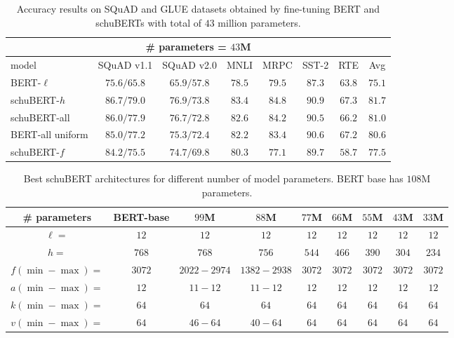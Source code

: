 \documentclass[11pt,a4paper]{article}
\begin{document}
\begin{table}[h]
\centering
\begin{tabular}{lcccccc|c}
\multicolumn{8}{c}{\# parameters = $43$M}\\
\hline
model & SQuAD v1.1 & SQuAD v2.0 & MNLI & MRPC & SST-2 & RTE & Avg\\
\hline
BERT-$\ell$ & $75.6/65.8$ &$65.9/57.8$& $78.5$ & $79.5$ & $87.3$ & $63.8$ & $75.1$\\
schuBERT-$h$ & $\pmb{86.7/79.0}$ &$\pmb{76.9/73.8}$& $\pmb{83.4}$ & $\pmb{84.8}$ & $\pmb{90.9}$ & $\pmb{67.3}$ & $\pmb{81.7}$\\
schuBERT-all & $86.0/77.9$ &$76.7/72.8$& $82.6$ & $84.2$ & $90.5$ & $66.2$ & $81.0$\\
BERT-all uniform & $85.0/77.2$ &$75.3/72.4$& $82.2$ & $83.4$ & $90.6$ & $67.2$ & $80.6$\\
schuBERT-$f$ & $84.2/75.5$ &$74.7/69.8$& $80.3$ & $77.1$ & $89.7$ & $58.7$ & $77.5$
\end{tabular}
\caption{\label{tab:results_43}Accuracy results on SQuAD and GLUE datasets obtained by fine-tuning BERT and schuBERTs with total of $43$ million parameters.
}
\end{table}

\begin{table}[h]
\centering
\begin{tabular}{c|cccccccc}
\hline
\# parameters & BERT-base & $99$M & $88$M & $77$M & $66$M & $55$M & $43$M & $33$M\\
\hline
$\ell =$ & $12$ & $12$ & $12$ & $12$ & $12$ & $12$ & $12$ & $12$\\
$h =$  & $768$ & $768$ & $756$ & $544$ & $466$ & $390$ & $304$ & $234$\\
$f(\min-\max) =$  & $3072$& $2022-2974$ & $1382-2938$ & $3072$ & $3072$ & $3072$ & $3072$ & $3072$\\
$a(\min-\max) =$  & $12$& $11-12$ & $11-12$ & $12$ & $12$ & $12$ & $12$ & $12$\\
$k(\min-\max) =$  & $64$& $64$ & $64$ & $64$ & $64$ & $64$ & $64$ & $64$\\
$v(\min-\max) =$  & $64$& $46-64$ & $40-64$ & $64$ & $64$ & $64$ & $64$ & $64$\\
\hline
\end{tabular}
\caption{\label{tab:schuBERTs} Best schuBERT architectures for different number of model parameters. BERT base has $108$M parameters.}
\end{table}
\end{document}
